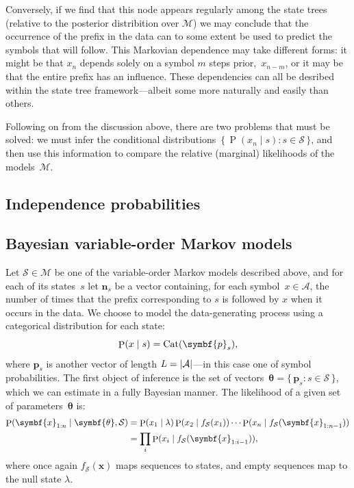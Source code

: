 \documentclass[12pt,a4paper]{article}
\newcommand\mc[1]{\mathcal{#1}}               %
\newcommand\ub[1]{\symbf{#1}}                 %
\DeclareMathOperator\Pb{P}                    %
\DeclarePairedDelimiter\lr{\lparen}{\rparen}  %
\DeclarePairedDelimiter\abs{\lvert}{\rvert}   %
\DeclareMathOperator\cat{Cat} %
\begin{document}
Conversely, if we find that this node appears regularly among the state trees
(relative to the posterior distribition over \(\mc{M}\)) we may conclude that
the occurrence of the prefix in the data can to some extent be used to predict
the symbols that will follow. This Markovian dependence may take different
forms: it might be that \(x_n\) depends solely on a symbol \(m\) steps
prior,~\(x_{n-m}\), or it may be that the entire prefix has an influence. These
dependencies can all be desribed within the state tree framework---albeit some
more naturally and easily than others.

Following on from the discussion above, there are two problems that must be
solved: we must infer the conditional distributions~\(\{\,\Pb(x_n \mid s) : s
\in \mc{S}\,\}\), and then use this information to compare the relative
(marginal) likelihoods of the models~\(\mc{M}\).

\subsection{Independence probabilities} %

\subsection{Bayesian variable-order Markov models} %

Let \(\mc{S} \in \mc{M}\) be one of the variable-order Markov models described
above, and for each of its states~\(s\) let \(\ub{n}_s\) be a vector containing,
for each symbol~\(x \in \mc{A}\), the number of times that the prefix
corresponding to \(s\) is followed by \(x\) when it occurs in the data. We
choose to model the data-generating process using a categorical distribution for
each state:
\begin{equation*}
  \Pb\lr{x \mid s} = \cat\lr{\ub{p}_s},
\end{equation*}
where \(\ub{p}_s\) is another vector of length \(L = \abs{\mc{A}}\)---in this
case one of symbol probabilities. The first object of inference is the set of
vectors~\(\ub{\theta} = \{\,\ub{p}_s : s \in \mc{S}\,\}\), which we can estimate
in a fully Bayesian manner. The likelihood of a given set of
parameters~\(\ub{\theta}\) is:
\begin{align*}
  \Pb\lr{\ub{x}_{1:n} \mid \ub{\theta}, \mc{S}} &= \Pb\lr{x_1 \mid \lambda}
    \Pb\lr{x_2 \mid f_{\mc{S}}\lr{x_1}} \dotsm
    \Pb\lr{x_n \mid f_{\mc{S}}\lr{\ub{x}_{1:n-1}}} \\
  &= \prod_i \Pb\lr{x_i \mid f_{\mc{S}}\lr{\ub{x}_{1:i-1}}},
\end{align*}
where once again \(f_{\mc{S}}(\ub{x})\) maps sequences to states, and empty
sequences map to the null state \(\lambda\).
\end{document}

